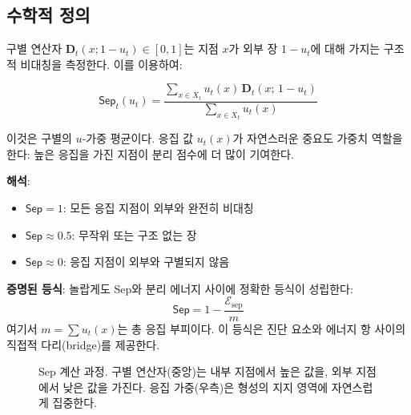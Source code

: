 \subsection{수학적 정의}

구별 연산자 $\mathbf{D}_t(x; 1-u_t) \in [0,1]$는 지점 $x$가 외부 장 $1-u_t$에 대해 가지는 구조적 비대칭을 측정한다. 이를 이용하여:

\begin{equation}
    \boxed{\mathsf{Sep}_t(u_t) = \frac{\sum_{x \in X_t} u_t(x)\, \mathbf{D}_t(x;\, 1-u_t)}{\sum_{x \in X_t} u_t(x)}}
    \label{eq:sep-def}
\end{equation}

이것은 구별의 $u$-가중 평균이다. 응집 값 $u_t(x)$가 자연스러운 중요도 가중치 역할을 한다: 높은 응집을 가진 지점이 분리 점수에 더 많이 기여한다.

\textbf{해석}:
\begin{itemize}
    \item $\mathsf{Sep} = 1$: 모든 응집 지점이 외부와 완전히 비대칭
    \item $\mathsf{Sep} \approx 0.5$: 무작위 또는 구조 없는 장
    \item $\mathsf{Sep} \approx 0$: 응집 지점이 외부와 구별되지 않음
\end{itemize}

\textbf{증명된 등식}: 놀랍게도 Sep와 분리 에너지 사이에 정확한 등식이 성립한다:
\begin{equation}
    \mathsf{Sep} = 1 - \frac{\mathcal{E}_{\mathrm{sep}}}{m}
    \label{eq:sep-energy-identity}
\end{equation}
여기서 $m = \sum u_t(x)$는 총 응집 부피이다. 이 등식은 진단 요소와 에너지 항 사이의 직접적 다리(bridge)를 제공한다.

\begin{figure}[t]
\centering
\caption{Sep 계산 과정. 구별 연산자(중앙)는 내부 지점에서 높은 값을, 외부 지점에서 낮은 값을 가진다. 응집 가중(우측)은 형성의 지지 영역에 자연스럽게 집중한다.}
\label{fig:sep-visualization}
\end{figure}

